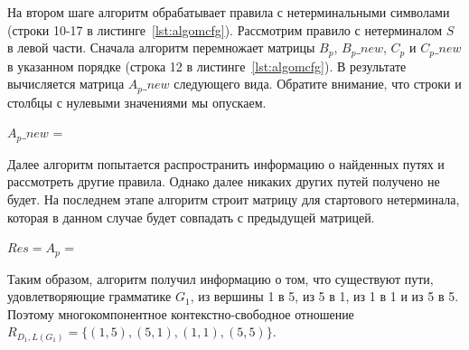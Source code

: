 
На втором шаге алгоритм обрабатывает правила с нетерминальными символами (строки 10-17 в листинге~\ref{lst:algomcfg}). Рассмотрим правило с нетерминалом $S$ в левой части. Сначала алгоритм перемножает матрицы $B_p$, $B_p\_new$, $C_p$ и $C_p\_new$ в указанном порядке (строка 12 в листинге~\ref{lst:algomcfg}). В результате вычисляется матрица $A_p\_{new}$ следующего вида. Обратите внимание, что строки и столбцы с нулевыми значениями мы опускаем.

\begin{center}
	$A_p\_new$ = 
\end{center}

Далее алгоритм попытается распространить информацию о найденных путях и рассмотреть другие правила. Однако далее никаких других путей получено не будет. На последнем этапе алгоритм строит матрицу для стартового нетерминала, которая в данном случае будет совпадать с предыдущей матрицей.

\begin{center}
	$Res = A_p$ = 
\end{center}

Таким образом, алгоритм получил информацию о том, что существуют пути, удовлетворяющие грамматике $G_1$, из вершины 1 в 5, из 5 в 1, из 1 в 1 и из 5 в 5. Поэтому многокомпонентное контекстно-свободное отношение $R_{D_1, L(G_1)} = \{(1, 5), (5, 1), (1, 1), (5, 5)\}$.


